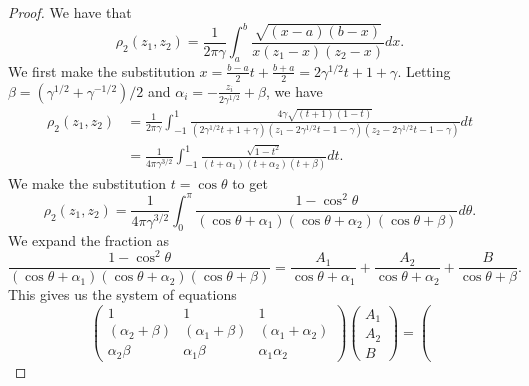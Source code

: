 \begin{proof}
    We have that
    \[
        \rho_2 (z_1, z_2)
        =
        \frac{1}{2 \pi \gamma}
        \int_{a}^{b}
        \frac{\sqrt{(x - a)(b - x)}}
             {x (z_1 - x) (z_2 - x)}
        dx.
    \]
    We first make the substitution 
    $x = \frac{b - a}{2} t + \frac{b + a}{2} = 2 \gamma^{1/2} t + 1 + \gamma$.
    Letting $\beta = (\gamma^{1/2} + \gamma^{-1/2})/2$ and
    $\alpha_i = -\frac{z_i}{2 \gamma^{1/2}} + \beta$, we have
    \begin{align*}
        \rho_2(z_1, z_2)
        &=
        \frac{1}{2 \pi \gamma}
        \int_{-1}^{1}
        \frac{4 \gamma \sqrt{(t + 1)(1 - t)}}
             {(2 \gamma^{1/2} t + 1 + \gamma)
              (z_1 - 2 \gamma^{1/2} t - 1 - \gamma)
              (z_2 - 2 \gamma^{1/2} t - 1 - \gamma)}
        dt \\
        &=
        \frac{1}{4 \pi \gamma^{3/2}}
        \int_{-1}^{1}
        \frac{\sqrt{1 - t^2}}
             {(t + \alpha_1)(t + \alpha_2)(t + \beta)}
        dt.
    \end{align*}
    We make the substitution $t = \cos \theta$ to get
    \[
        \rho_2(z_1, z_2)
        =
        \frac{1}{4 \pi \gamma^{3/2}}
        \int_0^\pi
        \frac{1 - \cos^2 \theta}
             {(\cos \theta + \alpha_1)
              (\cos \theta + \alpha_2)
              (\cos \theta + \beta)}
        d\theta.
    \]
    We expand the fraction as
    \[
        \frac{1 - \cos^2 \theta}
             {(\cos \theta + \alpha_1)
              (\cos \theta + \alpha_2)
              (\cos \theta + \beta)}
        =
        \frac{A_1}{\cos \theta + \alpha_1}
        +
        \frac{A_2}{\cos \theta + \alpha_2}
        +
        \frac{B}{\cos \theta + \beta}.
    \]
    This gives us the system of equations
    \[
        \left(
        \begin{matrix}
            1                  & 1                  & 1                \\
            (\alpha_2 + \beta) & (\alpha_1 + \beta) & (\alpha_1 + \alpha_2) \\
            \alpha_2 \beta     & \alpha_1 \beta     & \alpha_1 \alpha_2
        \end{matrix}
        \right)
        \left(
        \begin{matrix}
            A_1 \\
            A_2 \\
            B
        \end{matrix}
        \right)
        =
        \left(
\]
\end{proof}
